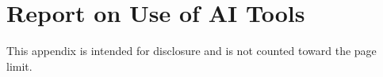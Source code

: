 \documentclass{article}
\begin{document}
\section{Report on Use of AI Tools}


This appendix is intended for disclosure and is not counted toward the page limit.
\end{document}
